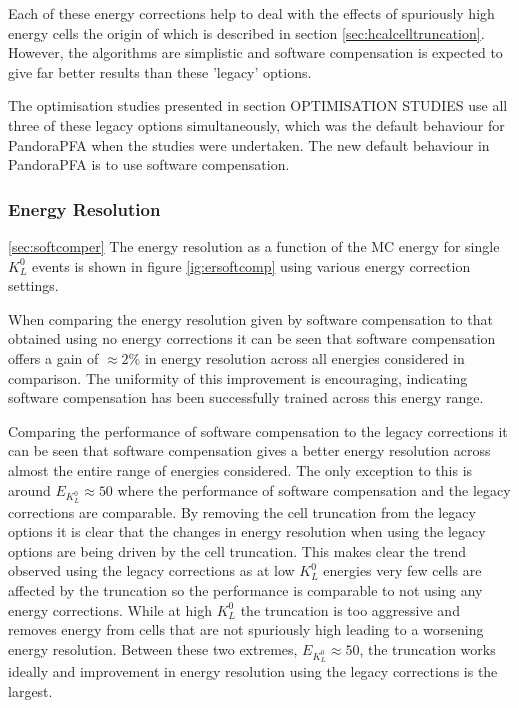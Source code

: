 Each of these energy corrections help to deal with the effects of spuriously high energy cells the origin of which is described in section \ref{sec:hcalcelltruncation}.  However, the algorithms are simplistic and software compensation is expected to give far better results than these 'legacy' options.  

The optimisation studies presented in section OPTIMISATION STUDIES use all three of these legacy options simultaneously, which was the default behaviour for PandoraPFA when the studies were undertaken.  The new default behaviour in PandoraPFA is to use software compensation.


\subsubsection{Energy Resolution}
\ref{sec:softcomper}
The energy resolution as a function of the MC energy for single $K^{0}_{L}$ events is shown in figure \ref{ig:ersoftcomp} using various energy correction settings.  

When comparing the energy resolution given by software compensation to that obtained using no energy corrections it can be seen that software compensation offers a gain of $\approx 2 \%$ in energy resolution across all energies considered in comparison.  The uniformity of this improvement is encouraging, indicating software compensation has been successfully trained across this energy range.   

Comparing the performance of software compensation to the legacy corrections it can be seen that software compensation gives a better energy resolution across almost the entire range of energies considered.  The only exception to this is around $E_{K^{0}_{L}} \approx 50$ where the performance of software compensation and the legacy corrections are comparable.  By removing the cell truncation from the legacy options it is clear that the changes in energy resolution when using the legacy options are being driven by the cell truncation.  This makes clear the trend observed using the legacy corrections as at low $K^{0}_{L}$ energies very few cells are affected by the truncation so the performance is comparable to not using any energy corrections.  While at high $K^{0}_{L}$ the truncation is too aggressive and removes energy from cells that are not spuriously high leading to a worsening energy resolution.  Between these two extremes, $E_{K^{0}_{L}} \approx 50$, the truncation works ideally and improvement in energy resolution using the legacy corrections is the largest.  


